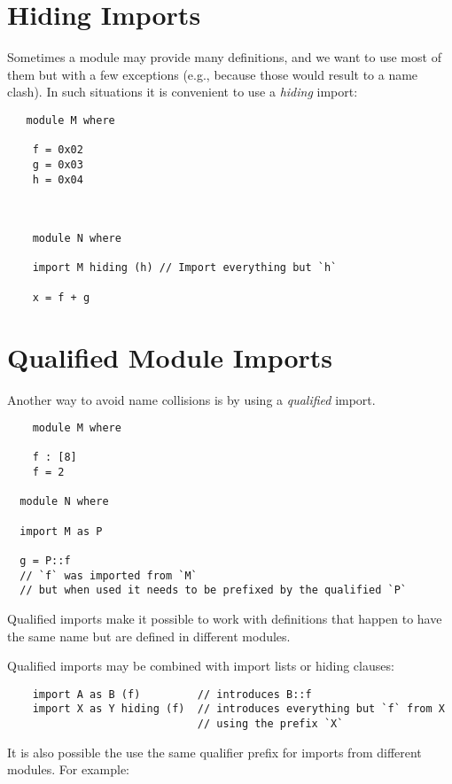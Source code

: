 \section{Hiding Imports}

Sometimes a module may provide many definitions, and we want to use
most of them but with a few exceptions (e.g., because those would
result to a name clash).   In such situations it is convenient
to use a \textit{hiding} import:


\begin{verbatim}
   module M where

    f = 0x02
    g = 0x03
    h = 0x04



    module N where

    import M hiding (h) // Import everything but `h`

    x = f + g
\end{verbatim}



\section{Qualified Module Imports}

Another way to avoid name collisions is by using a
\textit{qualified} import.

\begin{verbatim}
    module M where

    f : [8]
    f = 2

  module N where

  import M as P

  g = P::f
  // `f` was imported from `M`
  // but when used it needs to be prefixed by the qualified `P`
\end{verbatim}

Qualified imports make it possible to work with definitions
that happen to have the same name but are defined in different modules.

Qualified imports may be combined with import lists or hiding clauses:

\begin{verbatim}
    import A as B (f)         // introduces B::f
    import X as Y hiding (f)  // introduces everything but `f` from X
                              // using the prefix `X`
\end{verbatim}

It is also possible the use the same qualifier prefix for imports
from different modules.  For example:


